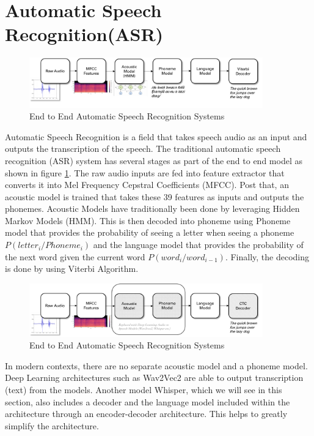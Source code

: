\section{Automatic Speech Recognition(ASR)}%
\label{sec:e2easrsystems}

\begin{figure} [H]
    \centering
    \includegraphics[width=0.9\textwidth]{03-Theoretical Foundations/figures/e2e_asr.pdf}
    \caption{End to End Automatic Speech Recognition Systems}
    \label{fig:e2easr}
\end{figure}

Automatic Speech Recognition is a field that takes speech audio as an input and outputs the transcription of the speech. The traditional automatic speech recognition (ASR) system has several stages as part of the end to end model as shown in figure \ref{fig:e2easr}. The raw audio inputs are fed into feature extractor that converts it into Mel Frequency Cepstral Coefficients (MFCC). Post that, an acoustic model is trained that takes these 39 features as inputs and outputs the phonemes. Acoustic Models have traditionally been done by leveraging Hidden Markov Models (HMM). This is then decoded into phoneme using Phoneme model that provides the probability of seeing a letter when seeing a phoneme $P(letter_i/Phoneme_i)$ and the language model that provides the probability of the next word given the current word $P(word_i/word_{i-1})$. Finally, the decoding is done by using Viterbi Algorithm.

\begin{figure} [H]
    \centering
    \includegraphics[width=0.9\textwidth]{03-Theoretical Foundations/figures/deeplearning_asr_systems.pdf}
    \caption{End to End Automatic Speech Recognition Systems}
    \label{fig:deepasr}
\end{figure}


In modern contexts, there are no separate acoustic model and a phoneme model. Deep Learning architectures such as Wav2Vec2 are able to output transcription (text) from the models. Another model Whisper, which we will see in this section, also includes a decoder and the language model included within the architecture through an encoder-decoder architecture. This helps to greatly simplify the architecture.


